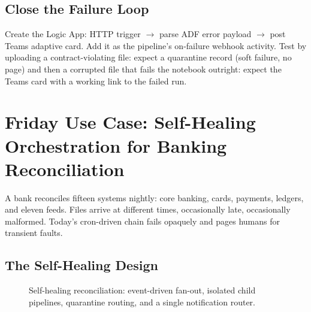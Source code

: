 \subsection{Close the Failure Loop}
Create the Logic App: HTTP trigger $\rightarrow$ parse ADF error payload $\rightarrow$ post Teams adaptive card. Add it as the pipeline's on-failure webhook activity. Test by uploading a contract-violating file: expect a quarantine record (soft failure, no page) and then a corrupted file that fails the notebook outright: expect the Teams card with a working link to the failed run.

\section{Friday Use Case: Self-Healing Orchestration for Banking Reconciliation}
A bank reconciles fifteen systems nightly: core banking, cards, payments, ledgers, and eleven feeds. Files arrive at different times, occasionally late, occasionally malformed. Today's cron-driven chain fails opaquely and pages humans for transient faults.

\subsection{The Self-Healing Design}
\begin{figure}[H]
    \centering
    \caption{Self-healing reconciliation: event-driven fan-out, isolated child pipelines, quarantine routing, and a single notification router.}
    \label{fig:ch12-self-healing}
\end{figure}

